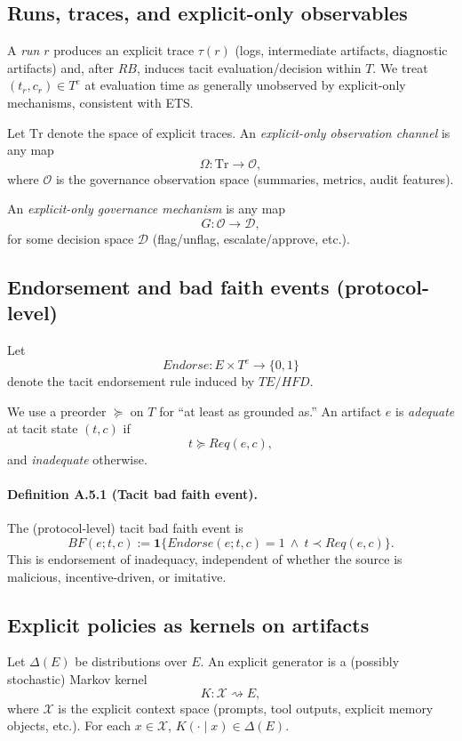 \documentclass[preprints,article,submit,pdftex,moreauthors,accept]{Definitions/mdpi}
\begin{document}
\subsection{Runs, traces, and explicit-only observables}
A \emph{run} \(r\) produces an explicit trace \(\tau(r)\) (logs, intermediate artifacts, diagnostic artifacts) and, after \(RB\), induces tacit evaluation/decision within \(T\).
We treat \((t_r,c_r)\in T^e\) at evaluation time as generally unobserved by explicit-only mechanisms, consistent with ETS.

Let \(\mathrm{Tr}\) denote the space of explicit traces. An \emph{explicit-only observation channel} is any map
\[
\Omega:\mathrm{Tr}\to \mathcal{O},
\]
where \(\mathcal{O}\) is the governance observation space (summaries, metrics, audit features).

An \emph{explicit-only governance mechanism} is any map
\[
G:\mathcal{O}\to \mathcal{D},
\]
for some decision space \(\mathcal{D}\) (flag/unflag, escalate/approve, etc.).

\subsection{Endorsement and bad faith events (protocol-level)}
Let
\[
Endorse:E\times T^e \to \{0,1\}
\]
denote the tacit endorsement rule induced by \(TE/HFD\).

We use a preorder \(\succeq\) on \(T\) for ``at least as grounded as.'' An artifact \(e\) is \emph{adequate} at tacit state \((t,c)\) if
\[
t \succeq Req(e,c),
\]
and \emph{inadequate} otherwise.

\paragraph{Definition A.5.1 (Tacit bad faith event).}
The (protocol-level) tacit bad faith event is
\[
BF(e;t,c) := \mathbf{1}\{Endorse(e;t,c)=1 \ \wedge\ t \prec Req(e,c)\}.
\]
This is endorsement of inadequacy, independent of whether the source is malicious, incentive-driven, or imitative.

\subsection{Explicit policies as kernels on artifacts}
Let \(\Delta(E)\) be distributions over \(E\). An explicit generator is a (possibly stochastic) Markov kernel
\[
K:\mathcal{X}\rightsquigarrow E,
\]
where \(\mathcal{X}\) is the explicit context space (prompts, tool outputs, explicit memory objects, etc.). For each \(x\in\mathcal{X}\), \(K(\cdot\mid x)\in \Delta(E)\).
\end{document}
